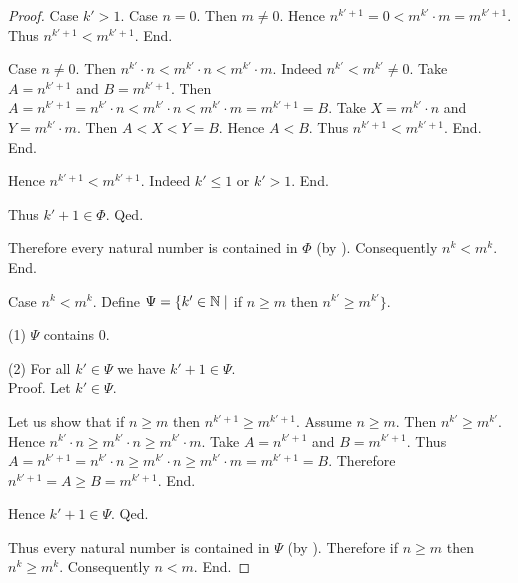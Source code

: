 \documentclass[10pt]{article}
\begin{document}
\begin{forthel}
\begin{proof}
            Case $k' > 1$.
              Case $n = 0$.
                Then $m \neq 0$.
                Hence $n^{k' + 1}
                  = 0
                  < m^{k'} \cdot m
                  = m^{k' + 1}$.
                Thus $n^{k' + 1} < m^{k' + 1}$.
              End.

              Case $n \neq 0$.
                Then $n^{k'} \cdot n
                  < m^{k'} \cdot n
                  < m^{k'} \cdot m$.
                Indeed $n^{k'} < m^{k'} \neq 0$.
                Take $A = n^{k' + 1}$ and $B = m^{k' + 1}$. %
                Then $A
                  = n^{k' + 1}
                  = n^{k'} \cdot n
                  < m^{k'} \cdot n
                  < m^{k'} \cdot m
                  = m^{k' + 1}
                  = B$.
                Take $X = m^{k'} \cdot n$ and $Y = m^{k'} \cdot m$.
                Then $A < X < Y = B$.
                Hence $A < B$.
                Thus $n^{k' + 1} < m^{k' + 1}$.
              End.
            End.

            Hence $n^{k' + 1} < m^{k' + 1}$.
            Indeed $k' \leq 1$ or $k' > 1$.
          End.

          Thus $k' + 1 \in \Phi$.
        Qed.

        Therefore every natural number is contained in $\Phi$ (by ).
        Consequently $n^{k} < m^{k}$.
      End.

      Case $n^{k} < m^{k}$.
        Define $\Psi = \{ k' \in \mathbb{N} \mid$ if $n \geq m$ then $n^{k'} \geq m^{k'} \}$.

        (1) $\Psi$ contains $0$.

        (2) For all $k' \in \Psi$ we have $k' + 1 \in \Psi$. \\
        Proof.
          Let $k' \in \Psi$.

          Let us show that if $n \geq m$ then $n^{k' + 1} \geq m^{k' + 1}$.
            Assume $n \geq m$.
            Then $n^{k'} \geq m^{k'}$.
            Hence $n^{k'} \cdot n \geq m^{k'} \cdot n \geq m^{k'} \cdot m$.
            Take $A = n^{k' + 1}$ and $B = m^{k' + 1}$. %
            Thus $A
              = n^{k' + 1}
              = n^{k'} \cdot n
              \geq m^{k'} \cdot n
              \geq m^{k'} \cdot m
              = m^{k' + 1}
              = B$.
            Therefore $n^{k' + 1} = A \geq B = m^{k' + 1}$.
          End.

          Hence $k' + 1 \in \Psi$.
        Qed.

        Thus every natural number is contained in $\Psi$ (by ).
        Therefore if $n \geq m$ then $n^{k} \geq m^{k}$.
        Consequently $n < m$.
      End.
    \end{proof}
  \end{forthel}
\end{document}
